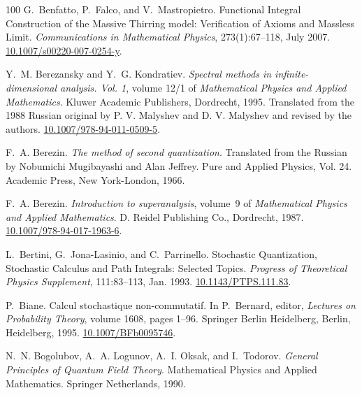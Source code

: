 \documentclass[11pt]{article}
\newcommand{\tmtextit}[1]{{\itshape{#1}}}
\begin{document}
\begin{thebibliography}{100}
  G.~Benfatto, P.~Falco, and
  V.~Mastropietro. {\newblock}Functional Integral Construction of the Massive
  Thirring model: Verification of Axioms and Massless Limit.
  {\newblock}\tmtextit{Communications in Mathematical Physics},
  273(1):67--118, July 2007. {\newblock}
  \href{https://doi.org/10.1007/s00220-007-0254-y}{10.1007/s00220-007-0254-y}.
  
  Y.~M. Berezansky and Y.~G. Kondratiev.
  {\newblock}\tmtextit{Spectral methods in infinite-dimensional analysis. Vol.
  1}, volume 12/1 of \tmtextit{Mathematical Physics and Applied Mathematics}.
  {\newblock}Kluwer Academic Publishers, Dordrecht, 1995.
  {\newblock}Translated from the 1988 Russian original by P. V. Malyshev and
  D. V. Malyshev and revised by the authors.
  \href{https://doi.org/10.1007/978-94-011-0509-5}{10.1007/978-94-011-0509-5}.
  
  F.~A. Berezin. {\newblock}\tmtextit{The method of
  second quantization}. {\newblock}Translated from the Russian by Nobumichi
  Mugibayashi and Alan Jeffrey. Pure and Applied Physics, Vol. 24. Academic
  Press, New York-London, 1966.
  
  F.~A. Berezin. {\newblock}\tmtextit{Introduction to
  superanalysis}, volume~9 of \tmtextit{Mathematical Physics and Applied
  Mathematics}. {\newblock}D. Reidel Publishing Co., Dordrecht, 1987.
  {\newblock}
  \href{https://doi.org/10.1007/978-94-017-1963-6}{10.1007/978-94-017-1963-6}.
  
  L.~Bertini, G.~Jona-Lasinio, and
  C.~Parrinello. {\newblock}Stochastic Quantization, Stochastic Calculus and
  Path Integrals: Selected Topics. {\newblock}\tmtextit{Progress of
  Theoretical Physics Supplement}, 111:83--113, Jan. 1993.
  {\newblock}\href{https://doi.org/10.1143/PTPS.111.83}{10.1143/PTPS.111.83}.
  
  P.~Biane. {\newblock}Calcul stochastique
  non-commutatif. {\newblock}In P.~Bernard, editor, \tmtextit{Lectures on
  Probability Theory}, volume 1608, pages 1--96. Springer Berlin Heidelberg,
  Berlin, Heidelberg, 1995.
  {\newblock}\href{https://doi.org/10.1007/BFb0095746}{10.1007/BFb0095746}.
  
  N.~N. Bogolubov, A.~A. Logunov, A.~I.
  Oksak, and I.~Todorov. {\newblock}\tmtextit{General Principles of Quantum
  Field Theory}. {\newblock}Mathematical Physics and Applied Mathematics.
  Springer Netherlands, 1990.
  

\end{thebibliography}
\end{document}
